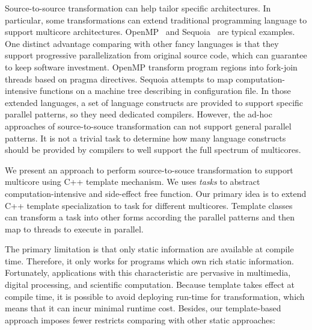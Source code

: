 Source-to-source transformation can help tailor specific
architectures. In particular, some transformations can extend
traditional programming language to support multicore
architectures. OpenMP~\cite{openmp} and Sequoia~\cite{sequoia, sequoia-compiler}
are typical examples. One distinct advantage comparing with other
fancy languages is that they
support progressive parallelization from original source code, which
can guarantee to keep software investment. OpenMP transform program
regions into fork-join threads based on pragma directives. Sequoia attempts to map computation-intensive functions
on a machine tree describing in configuration file. In those
extended languages,  a set of language
constructs are provided to support specific parallel patterns, so they
need dedicated compilers. However, the ad-hoc approaches of
source-to-souce transformation can not support general parallel
patterns. It is not a trivial task to determine how many language
constructs should be provided by compilers to well support the
full spectrum of multicores.

We present an approach to perform source-to-souce transformation to
support multicore using C++ template mechanism. We uses \emph{tasks}
to abstract computation-intensive and side-effect free function. Our
primary idea is to extend C++ template specialization to task for
different multicores.  Template
classes can transform a task into other forms according the parallel
patterns and then map to threads to execute in parallel. 

The primary limitation is that only static
information are available at compile time. Therefore, it only works
for programs which own rich static information. Fortunately,
applications with this characteristic are pervasive in multimedia,
digital processing, and scientific computation.  Because template takes effect at compile time, it is possible to avoid
deploying run-time for transformation, which means that it can incur minimal
runtime cost. Besides, our template-based approach imposes fewer restricts comparing with other static approaches:


